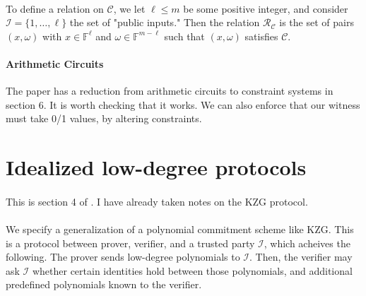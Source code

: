 \documentclass[11pt]{article}
\newcommand{\field}{\mathbb{F}}
\begin{document}
\paragraph{} To define a relation on $\mathscr{C}$, we let $\ell \leq m$ be some positive integer, and consider $\mathcal{I} = \{1, \ldots, \ell\}$ the set of "public inputs." Then the relation $\mathcal{R}_\mathscr{C}$ is the set of pairs $(x, \omega)$ with $x \in \field^\ell$ and $\omega \in \field^{m - \ell}$ such that $(x, \omega)$ satisfies $\mathscr{C}$.

\paragraph{Arithmetic Circuits} The paper has a reduction from arithmetic circuits to constraint systems in section 6. It is worth checking that it works. We can also enforce that our witness must take 0/1 values, by altering constraints.

\section{Idealized low-degree protocols}
\paragraph{} This is section 4 of \cite{plonk}. I have already taken notes on the KZG protocol.

\paragraph{} We specify a generalization of a polynomial commitment scheme like KZG. This is a protocol between prover, verifier, and a trusted party $\mathcal{I}$, which acheives the following. The prover sends low-degree polynomials to $\mathcal{I}$. Then, the verifier may ask $\mathcal{I}$ whether certain identities hold between those polynomials, and additional predefined polynomials known to the verifier.
\end{document}
